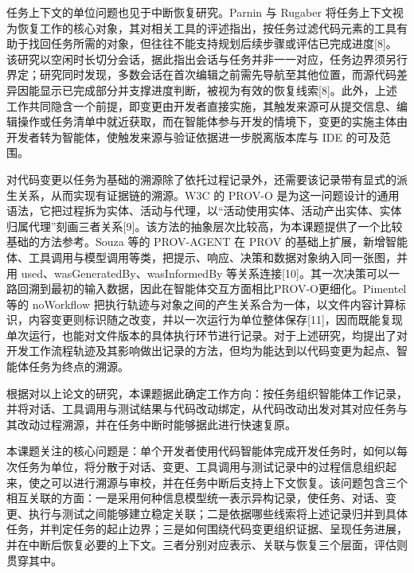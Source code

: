 任务上下文的单位问题也见于中断恢复研究。Parnin 与 Rugaber 将任务上下文视为恢复工作的核心对象，其对相关工具的评述指出，按任务过滤代码元素的工具有助于找回任务所需的对象，但往往不能支持规划后续步骤或评估已完成进度[8]。该研究以空闲时长切分会话，据此指出会话与任务并非一一对应，任务边界须另行界定；研究同时发现，多数会话在首次编辑之前需先导航至其他位置，而源代码差异因能显示已完成部分并支撑进度判断，被视为有效的恢复线索[8]。此外，上述工作共同隐含一个前提，即变更由开发者直接实施，其触发来源可从提交信息、编辑操作或任务清单中就近获取，而在智能体参与开发的情境下，变更的实施主体由开发者转为智能体，使触发来源与验证依据进一步脱离版本库与 IDE 的可及范围。


对代码变更以任务为基础的溯源除了依托过程记录外，还需要该记录带有显式的派生关系，从而实现有证据链的溯源。W3C 的 PROV-O 是为这一问题设计的通用语法，它把过程拆为实体、活动与代理，以“活动使用实体、活动产出实体、实体归属代理”刻画三者关系[9]。该方法的抽象层次比较高，为本课题提供了一个比较基础的方法参考。Souza 等的 PROV-AGENT 在 PROV 的基础上扩展，新增智能体、工具调用与模型调用等类，把提示、响应、决策和数据对象纳入同一张图，并用 used、wasGeneratedBy、wasInformedBy 等关系连接[10]。其一次决策可以一路回溯到最初的输入数据，因此在智能体交互方面相比PROV-O更细化。Pimentel 等的 noWorkflow 把执行轨迹与对象之间的产生关系合为一体，以文件内容计算标识，内容变更则标识随之改变，并以一次运行为单位整体保存[11]，因而既能复现单次运行，也能对文件版本的具体执行环节进行记录。对于上述研究，均提出了对开发工作流程轨迹及其影响做出记录的方法，但均为能达到以代码变更为起点、智能体任务为终点的溯源。

根据对以上论文的研究，本课题据此确定工作方向：按任务组织智能体工作记录，并将对话、工具调用与测试结果与代码改动绑定，从代码改动出发对其对应任务与其改动过程溯源，并在任务中断时能够据此进行快速复原。



本课题关注的核心问题是：单个开发者使用代码智能体完成开发任务时，如何以每次任务为单位，将分散于对话、变更、工具调用与测试记录中的过程信息组织起来，使之可以进行溯源与审校，并在任务中断后支持上下文恢复。该问题包含三个相互关联的方面：一是采用何种信息模型统一表示异构记录，使任务、对话、变更、执行与测试之间能够建立稳定关联；二是依据哪些线索将上述记录归并到具体任务，并判定任务的起止边界；三是如何围绕代码变更组织证据、呈现任务进展，并在中断后恢复必要的上下文。三者分别对应表示、关联与恢复三个层面，评估则贯穿其中。

